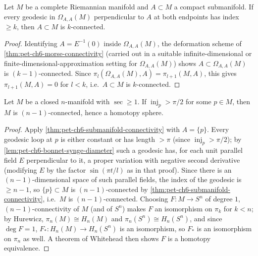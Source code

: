 \begin{theorem}[Theorem 6.5.3]
  \label{thm:pet-ch6-submanifold-connectivity}
  Let $M$ be a complete Riemannian manifold and $A\subset M$ a compact
  submanifold. If every geodesic in $\Omega_{A,A}(M)$ perpendicular to $A$ at
  both endpoints has index $\ge k$, then $A\subset M$ is $k$-connected.
\end{theorem}
\begin{proof}
  Identifying $A=E^{-1}(0)$ inside $\Omega_{A,A}(M)$, the deformation scheme
  of \cref{thm:pet-ch6-morse-connectivity} (carried out in a suitable
  infinite-dimensional or finite-dimensional-approximation setting for
  $\Omega_{A,A}(M)$) shows $A\subset\Omega_{A,A}(M)$ is $(k-1)$-connected.
  Since $\pi_l(\Omega_{A,A}(M),A)=\pi_{l+1}(M,A)$, this gives
  $\pi_{l+1}(M,A)=0$ for $l<k$, i.e.\ $A\subset M$ is $k$-connected.
\end{proof}

\begin{theorem}
  \label{thm:pet-ch6-berger-sphere-theorem}
  Let $M$ be a closed $n$-manifold with $\sec\ge1$. If $\operatorname{inj}_p>\pi/2$ for
  some $p\in M$, then $M$ is $(n-1)$-connected, hence a homotopy sphere.
\end{theorem}
\begin{proof}
  Apply \cref{thm:pet-ch6-submanifold-connectivity} with $A=\{p\}$. Every
  geodesic loop at $p$ is either constant or has length $>\pi$ (since
  $\operatorname{inj}_p>\pi/2$); by \cref{lem:pet-ch6-bonnet-synge-diameter} such a
  geodesic has, for each unit parallel field $E$ perpendicular to it, a
  proper variation with negative second derivative (modifying $E$ by the
  factor $\sin(\pi t/l)$ as in that proof). Since there is an
  $(n-1)$-dimensional space of such parallel fields, the index of the
  geodesic is $\ge n-1$, so $\{p\}\subset M$ is $(n-1)$-connected by
  \cref{thm:pet-ch6-submanifold-connectivity}, i.e.\ $M$ is
  $(n-1)$-connected. Choosing $F:M\to S^n$ of degree $1$, $(n-1)$-connectivity
  of $M$ (and of $S^n$) makes $F$ an isomorphism on $\pi_k$ for $k<n$; by
  Hurewicz, $\pi_n(M)\cong H_n(M)$ and $\pi_n(S^n)\cong H_n(S^n)$, and since
  $\deg F=1$, $F_*:H_n(M)\to H_n(S^n)$ is an isomorphism, so $F_*$ is an
  isomorphism on $\pi_n$ as well. A theorem of Whitehead then shows $F$ is a
  homotopy equivalence.
\end{proof}

